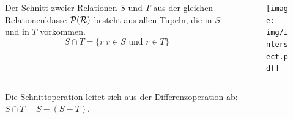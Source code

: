 \begin{frame}\frametitle{\insertsection}
\framesubtitle{\insertsubsection}
\onslide
{}
\vspace{5mm}
\begin{columns}
	\begin{column}{.58\textwidth}
		Der Schnitt zweier Relationen $S$ und $T$ aus der gleichen Relationenklasse $\mathcal{P}(\mathcal{R})$
		besteht aus allen Tupeln, die in $S$ und in $T$ vorkommen.
		\begin{equation*}
		S\cap T=\{r|r\in S \text{\ und\ } r \in T\}
		\end{equation*}
	\end{column}
	\begin{column}{.33\textwidth}
		\begin{figure}
			\vspace{-0.5cm}
			\texttt{[image: img/intersect.pdf]}
		\end{figure}
	\end{column}
\end{columns}
\pause
\abs\abs\abs\abs
Die Schnittoperation leitet sich aus der Differenzoperation ab: $S\cap T = S-(S-T)$.\\
\end{frame}

